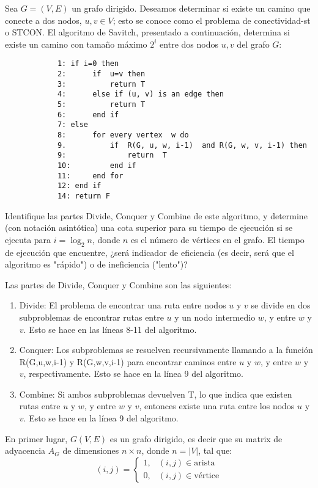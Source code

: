 \begin{problema}
    Sea $G=(V, E)$ un grafo dirigido. Deseamos determinar si existe un camino que conecte a dos nodos, $u, v \in V$; esto se conoce como el problema de conectividad-st o STCON. El algoritmo de Savitch, presentado a continuación, determina si existe un camino con tamaño máximo $2^i$ entre dos nodos $u, v$ del grafo $G$: 
    \begin{verbatim}
            1: if i=0 then
            2:      if  u=v then 
            3:          return T
            4:      else if (u, v) is an edge then
            5:          return T
            6:      end if
            7: else
            8:      for every vertex  w do
            9.          if  R(G, u, w, i-1)  and R(G, w, v, i-1) then
            9:              return  T
            10:         end if
            11:     end for
            12: end if
            14: return F
    \end{verbatim}
    Identifique las partes Divide, Conquer y Combine de este algoritmo, y determine (con notación asintótica) una cota superior para su tiempo de ejecución si se ejecuta para $i=\log _2 n$, donde $n$ es el número de vértices en el grafo. El tiempo de ejecución que encuentre, ¿será indicador de eficiencia (es decir, será que el algoritmo es "rápido") o de ineficiencia ("lento")?
    \begin{sol}
        Las partes de Divide, Conquer y Combine son las siguientes: 
        \begin{enumerate}
            \item Divide: El problema de encontrar una ruta entre nodos $u$ y $v$ se divide en dos subproblemas de encontrar rutas entre $u$ y un nodo intermedio $w$, y entre $w$ y $v$. Esto se hace en las líneas 8-11 del algoritmo.
            \item Conquer: Los subproblemas se resuelven recursivamente llamando a la función R(G,u,w,i-1) y R(G,w,v,i-1) para encontrar caminos entre $u$ y $w$, y entre $w$ y $v$, respectivamente. Esto se hace en la línea 9 del algoritmo.
            \item Combine: Si ambos subproblemas devuelven T, lo que indica que existen rutas entre $u$ y $w$, y entre $w$ y $v$, entonces existe una ruta entre los nodos $u$ y $v$. Esto se hace en la línea 9 del algoritmo.
        \end{enumerate}
        En primer lugar, $G(V,E)$  es un grafo dirigido, es decir que su matrix de adyacencia $A_G$ de dimensiones $n\times n$, donde $n=|V|$, tal que: 
        $$(i,j)=\begin{cases}
            1, & (i,j)\in \text{arista}\\
            0, & (i,j)\in \text{vértice}
        \end{cases}$$


\end{sol}
\end{problema}
